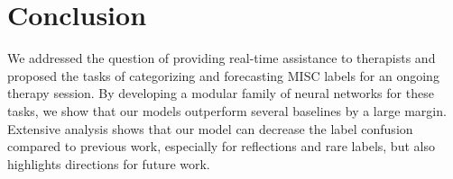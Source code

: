 \section{Conclusion}
We addressed the question of providing real-time assistance to
therapists and proposed the tasks of categorizing and forecasting MISC
labels for an ongoing therapy session. By developing a modular family
of neural networks for these tasks, we show that our models outperform several
baselines by a large margin.
%
Extensive analysis shows
that our model can decrease the label confusion compared to previous
work, especially for reflections and rare labels, but also
highlights directions for future work. 

